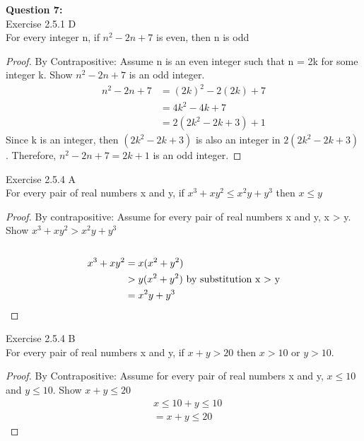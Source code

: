 \documentclass[11pt]{article}
\begin{document}
\newpage

\noindent \textbf{Question 7:}\\


\noindent Exercise 2.5.1 D \\

\noindent For every integer n, if $n^2 - 2n + 7$ is even, then n is odd\\
\begin{proof}
	By Contrapositive: Assume n is an even integer such that n = 2k for some integer k. Show $n^2 - 2n +7$ is an odd integer. 
  \begin{align*}
  	n^2 - 2n + 7 &= (2k)^2 - 2(2k) + 7\\
	&=4k^2 - 4k + 7\\
	&=2(2k^2 - 2k + 3) + 1
  \end{align*}
  Since k is an integer, then $(2k^2 - 2k + 3)$ is also an integer in $2(2k^2 - 2k + 3)$. Therefore, $n^2 - 2n + 7 = 2k+1$ is an odd integer.
  
\end{proof}

\noindent Exercise 2.5.4 A\\

\noindent For every pair of real numbers x and y, if $x^3 + xy^2 \leq x^2y + y^3$ then $x \leq y$\\
\begin{proof}
By contrapositive: Assume for every pair of real numbers x and y, x > y. Show $x^3 + xy^2 > x^2y + y^3$\\\\

\begin{align*}
x^3 + xy^2 &= x(x^2 + y^2)\\
&> y(x^2 + y^2) \text{ by substitution x > y} \\ 
&= x^2y + y^3 \qedhere
\end{align*}
\end{proof}

\noindent Exercise 2.5.4 B\\

\noindent For every pair of real numbers x and y, if $x + y > 20$ then $x > 10$ or $y > 10$.\\
\begin{proof}
By Contrapositive: Assume for every pair of real numbers x and y, $x \leq 10$ and $y \leq 10$. Show $x + y \leq 20$\\
\begin{align*}
&x \leq 10 + y \leq 10\\ &= x + y \leq 20
\end{align*}
\end{proof}
  
\end{document}
